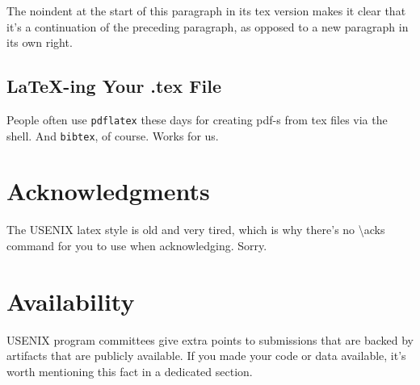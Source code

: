 \noindent
The noindent at the start of this paragraph in its tex version makes
it clear that it's a continuation of the preceding paragraph, as
opposed to a new paragraph in its own right.

\subsection{LaTeX-ing Your .tex File}
People often use \texttt{pdflatex} these days for creating pdf-s from
tex files via the shell. And \texttt{bibtex}, of course. Works for us.

\section*{Acknowledgments}
The USENIX latex style is old and very tired, which is why
there's no \textbackslash{}acks command for you to use when
acknowledging. Sorry.

\section*{Availability}
USENIX program committees give extra points to submissions that are
backed by artifacts that are publicly available. If you made your code
or data available, it's worth mentioning this fact in a dedicated
section.



